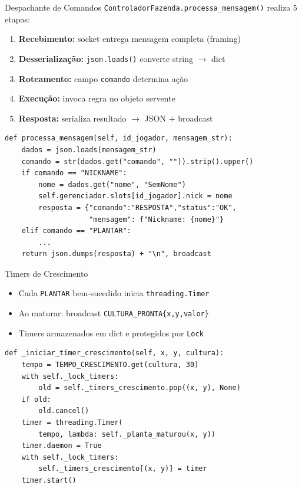 \documentclass[aspectratio=169]{beamer}
\begin{document}
\begin{frame}[fragile, shrink=8]{Despachante de Comandos}
  \texttt{ControladorFazenda.processa\_mensagem()} realiza 5 etapas:
  \begin{enumerate}
    \item \textbf{Recebimento:} socket entrega mensagem completa (framing)
    \item \textbf{Desserializa\c{c}\~ao:} \texttt{json.loads()} converte string $\rightarrow$ dict
    \item \textbf{Roteamento:} campo \texttt{comando} determina a\c{c}\~ao
    \item \textbf{Execu\c{c}\~ao:} invoca regra no objeto servente
    \item \textbf{Resposta:} serializa resultado $\rightarrow$ JSON + broadcast
  \end{enumerate}
\begin{lstlisting}[style=pycode, basicstyle=\ttfamily\scriptsize]
def processa_mensagem(self, id_jogador, mensagem_str):
    dados = json.loads(mensagem_str)
    comando = str(dados.get("comando", "")).strip().upper()
    if comando == "NICKNAME":
        nome = dados.get("nome", "SemNome")
        self.gerenciador.slots[id_jogador].nick = nome
        resposta = {"comando":"RESPOSTA","status":"OK",
                    "mensagem": f"Nickname: {nome}"}
    elif comando == "PLANTAR":
        ...
    return json.dumps(resposta) + "\n", broadcast
\end{lstlisting}
\end{frame}

\begin{frame}[fragile, shrink=8]{Timers de Crescimento}
  \begin{itemize}
    \item Cada \texttt{PLANTAR} bem-sucedido inicia \texttt{threading.Timer}
    \item Ao maturar: broadcast \texttt{CULTURA\_PRONTA\{x,y,valor\}}
    \item Timers armazenados em dict e protegidos por \texttt{Lock}
  \end{itemize}
\begin{lstlisting}[style=pycode, basicstyle=\ttfamily\footnotesize]
def _iniciar_timer_crescimento(self, x, y, cultura):
    tempo = TEMPO_CRESCIMENTO.get(cultura, 30)
    with self._lock_timers:
        old = self._timers_crescimento.pop((x, y), None)
    if old:
        old.cancel()
    timer = threading.Timer(
        tempo, lambda: self._planta_maturou(x, y))
    timer.daemon = True
    with self._lock_timers:
        self._timers_crescimento[(x, y)] = timer
    timer.start()
\end{lstlisting}
\end{frame}
\end{document}
